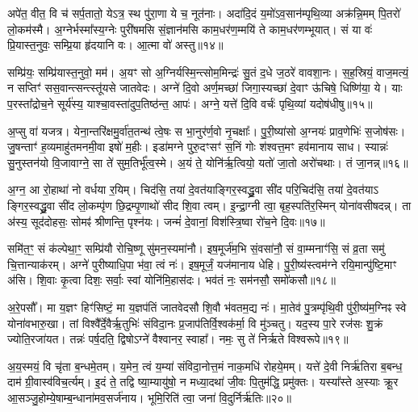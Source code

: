 {\anuvakamend[{आ तवो॒र्जा\-ऽनु॒ षोड॑श च॥३॥}]}

अपे॑त॒ वीत॒ वि च॑ सर्प॒तातो॒ ये\-ऽत्र॒ स्थ पु॑रा॒णा ये च॒ नूत॑नाः। अदा॑दि॒दं य॒मो॑\-ऽव॒सान॑म्पृथि॒व्या अक्र॑न्नि॒मम् पि॒तरो॑ लो॒कम॑स्मै। अ॒ग्नेर्भस्मा᳚स्य॒ग्नेः पुरी॑षमसि सं॒ज्ञान॑मसि काम॒धर॑ण॒म्मयि॑ ते काम॒धर॑णम्भूयात्। सं या वः॑ प्रि॒यास्त॒नुवः॒ सम्प्रि॒या हृ॑दयानि वः। आ॒त्मा वो॑ अस्तु॥१४॥

सम्प्रि॑यः॒ सम्प्रि॑यास्त॒नुवो॒ मम॑। अ॒यꣳ सो अ॒ग्निर्यस्मि॒न्त्सोम॒मिन्द्रः॑ सु॒तं द॒धे ज॒ठरे॑ वावशा॒नः। स॒ह॒स्रियं॒ वाज॒मत्यं॒ न सप्तिꣳ॑ सस॒वान्त्सन्त्स्तू॑यसे जातवेदः। अग्ने॑ दि॒वो अर्ण॒मच्छा॑ जिगा॒स्यच्छा॑ दे॒वाꣳ ऊ॑चिषे॒ धिष्णि॑या॒ ये। याः प॒रस्ता᳚द्रोच॒ने सूर्य॑स्य॒ याश्चा॒वस्ता॑दुप॒तिष्ठ॑न्त॒ आपः॑। अग्ने॒ यत्ते॑ दि॒वि वर्चः॑ पृथि॒व्यां यदोष॑धीषु॥१५॥

अ॒प्सु वा॑ यजत्र। येना॒न्तरि॑क्षमु॒र्वा॑त॒तन्थ॑ त्वे॒षः स भा॒नुर॑र्ण॒वो नृ॒चक्षाः᳚। पु॒री॒ष्या॑सो अ॒ग्नयः॑ प्राव॒णेभिः॑ स॒जोष॑सः। जु॒षन्ताꣳ॑ ह॒व्यमाहु॑तमनमी॒वा इषो॑ म॒हीः। इडा॑मग्ने पुरु॒दꣳसꣳ॑ स॒निं गोः श॑श्वत्त॒मꣳ हव॑मानाय साध। स्यान्नः॑ सु॒नुस्तन॑यो वि॒जावाग्ने॒ सा ते॑ सुम॒तिर्भू᳚त्व॒स्मे। अ॒यं ते॒ योनि॑र्\mbox{}ऋ॒त्वियो॒ यतो॑ जा॒तो अरो॑चथाः। तं जा॒नन्न्॥१६॥

अ॒ग्न॒ आ रो॒हाथा॑ नो वर्धया र॒यिम्। चिद॑सि॒ तया॑ दे॒वत॑याङ्गिर॒स्वद्ध्रु॒वा सी॑द परि॒चिद॑सि॒ तया॑ दे॒वत॑या\-ऽ ङ्गिर॒स्वद्ध्रु॒वा सी॑द लो॒कम्पृ॑ण छि॒द्रम्पृ॒णाथो॑ सीद शि॒वा त्वम्। इ॒न्द्रा॒ग्नी त्वा॒ बृह॒स्पति॑र॒स्मिन् योना॑वसीषदन्न्। ता अ॑स्य॒ सूद॑दोहसः॒ सोमꣴ॑ श्रीणन्ति॒ पृश्न॑यः। जन्मं॑ दे॒वानां॒ विश॑स्त्रि॒ष्वा रो॑च॒ने दि॒वः॥१७॥

{\anuvakamend[{अ॒स्त्वोष॑धीषु जा॒नन्न॒ष्टाच॑त्वारिꣳशच्च॥४॥}]}

समि॑त॒ꣳ॒ सं क॑ल्पेथा॒ꣳ॒ सम्प्रि॑यौ रोचि॒ष्णू सु॑मन॒स्यमा॑नौ। इष॒मूर्ज॑म॒भि सं॒वसा॑नौ॒ सं वा॒म्मनाꣳ॑सि॒ सं व्र॒ता समु॑ चि॒त्तान्याक॑रम्। अग्ने॑ पुरीष्याधि॒पा भ॑वा॒ त्वं नः॑। इष॒मूर्जं॒ यज॑मानाय धेहि। पु॒री॒ष्य॑स्त्वम॑ग्ने रयि॒मान्पु॑ष्टि॒माꣳ अ॑सि। शि॒वाः कृ॒त्वा दिशः॒ सर्वाः॒ स्वां योनि॑मि॒हास॑दः। भव॑तं नः॒ सम॑नसौ॒ समो॑कसौ॥१८॥

अ॒रे॒पसौ᳚। मा य॒ज्ञꣳ हिꣳ॑सिष्टं॒ मा य॒ज्ञप॑तिं जातवेदसौ शि॒वौ भ॑वतम॒द्य नः॑। मा॒तेव॑ पु॒त्रम्पृ॑थि॒वी पु॑री॒ष्य॑म॒ग्निꣴ स्वे योना॑वभारु॒खा। तां विश्वै᳚र्दे॒वैर्\mbox{}ऋ॒तुभिः॑ संविदा॒नः प्र॒जाप॑तिर्वि॒श्वक॑र्मा॒ वि मु॑ञ्चतु। यद॒स्य पा॒रे रज॑सः शु॒क्रं ज्योति॒रजा॑यत। तन्नः॑ पर्\mbox{}ष॒दति॒ द्विषो\-ऽग्ने॑ वैश्वानर॒ स्वाहा᳚। नमः॒ सु ते॑ निर्\mbox{}ऋते विश्वरूपे॥१९॥

अ॒य॒स्मयं॒ वि चृ॑ता ब॒न्धमे॒तम्। य॒मेन॒ त्वं य॒म्या॑ संविदा॒नोत्त॒मं नाक॒मधि॑ रोहये॒मम्। यत्ते॑ दे॒वी निर्\mbox{}ऋ॑तिरा ब॒बन्ध॒ दाम॑ ग्री॒वास्व॑विच॒र्त्यम्। इ॒दं ते॒ तद्वि ष्या॒म्यायु॑षो॒ न मध्या॒दथा॑ जी॒वः पि॒तुम॑द्धि॒ प्रमु॑क्तः। यस्या᳚स्ते अ॒स्याः क्रू॒र आ॒सञ्जु॒होम्ये॒षाम्ब॒न्धाना॑मव॒सर्ज॑नाय। भूमि॒रिति॑ त्वा॒ जना॑ वि॒दुर्निर्\mbox{}ऋ॑तिः॥२०॥

